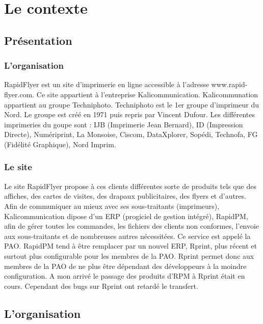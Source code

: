 \documentclass[a4paper]{report}
\begin{document}
\part{Le contexte}
\chapter{Présentation}
\section{L'organisation}
RapidFlyer est un site d’imprimerie en ligne accessible à l’adresse www.rapid-flyer.com. Ce site appartient à l’entreprise Kalicommunication. Kalicommunation appartient au groupe Techniphoto. 
Techniphoto est le 1er groupe d'imprimeur du Nord. 
Le groupe est créé en 1971 puis repris par Vincent Dufour. Les différentes imprimeries du goupe sont : IJB (Imprimerie Jean Bernard), ID (Impression Directe), Numériprint, La Monsoise, Ciscom, DataXplorer, Sopédi, Technofa, FG (Fidélité Graphique), Nord Imprim. 

\section{Le site}
Le site RapidFlyer propose à ces clients différentes sorte de produits tels que des affiches, des cartes de visites, des drapaux publicitaires, des flyers et d’autres. 
Afin de communiquer au mieux avec ses sous-traitants (imprimeurs), Kalicommunication dipose d’un ERP (progiciel de gestion intégré), RapidPM, afin de gérer toutes les commandes, les fichiers des clients non conformes, l’envoie aux sous-traitants et de nombreuses autres nécessitées. Ce service est appelé la PAO. RapidPM tend à être remplacer par un nouvel ERP, Rprint, plus récent et surtout plus configurable pour les membres de la PAO. Rprint permet donc aux membres de la PAO de ne plus être dépendant des développeurs à la moindre configuration. A mon arrivé le passage des produits d’RPM à Rprint était en cours. Cependant des bugs sur Rprint ont retardé le transfert. %

\chapter{L'organisation}
\end{document}
